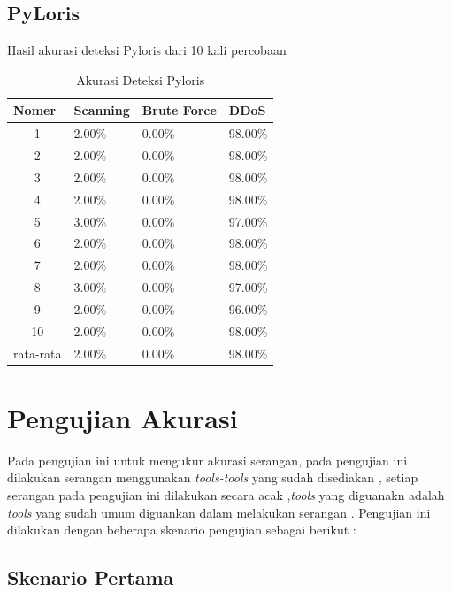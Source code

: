 \subsection{PyLoris}
Hasil akurasi deteksi Pyloris dari 10 kali percobaan
\begin{table}[H]
	\centering
	\caption{Akurasi Deteksi Pyloris}
	\label{Akurasi Deteksi Pyloris}
	\begin{tabular}{|c|l|l|l|}
		\hline
		\multicolumn{1}{|l|}{Nomer}     & Scanning & Brute Force & DDoS    \\ \hline
		1                               & 2.00\%   & 0.00\%      & 98.00\% \\ \hline
		2                               & 2.00\%   & 0.00\%      & 98.00\% \\ \hline
		3                               & 2.00\%   & 0.00\%      & 98.00\% \\ \hline
		4                               & 2.00\%   & 0.00\%      & 98.00\% \\ \hline
		5                               & 3.00\%   & 0.00\%      & 97.00\% \\ \hline
		6                               & 2.00\%   & 0.00\%      & 98.00\% \\ \hline
		7                               & 2.00\%   & 0.00\%      & 98.00\% \\ \hline
		8                               & 3.00\%   & 0.00\%      & 97.00\% \\ \hline
		9                               & 2.00\%   & 0.00\%      & 96.00\% \\ \hline
		10                              & 2.00\%   & 0.00\%      & 98.00\% \\ \hline
		\multicolumn{1}{|l|}{rata-rata} & 2.00\%   & 0.00\%      & 98.00\% \\ \hline
	\end{tabular}
\end{table}
	\section{Pengujian Akurasi}		
		Pada pengujian ini untuk mengukur akurasi serangan, pada pengujian ini dilakukan serangan menggunakan \emph{tools-tools} yang sudah disediakan , setiap serangan pada pengujian ini dilakukan secara acak  ,\emph{tools} yang diguanakn adalah \emph{tools} yang sudah umum diguankan dalam melakukan serangan . Pengujian ini dilakukan  dengan beberapa skenario pengujian sebagai berikut :
		\subsection{Skenario Pertama}
		
